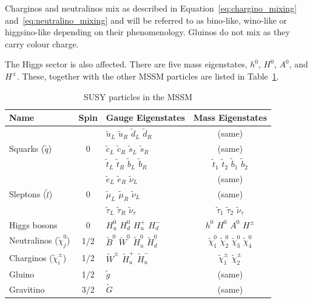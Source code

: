 				Charginos and neutralinos mix as described in Equation~\ref{eq:chargino_mixing} and~\ref{eq:neutralino_mixing} and will be referred to as bino-like, wino-like or higgsino-like depending on their phenomenology. Gluinos do not mix as they carry colour charge. 

				The Higgs sector is also affected. There are five mass eigenstates, $h^0$, $H^0$, $A^0$, and $H^{\pm}$. These, together with the other \ac{MSSM} particles are listed in Table~\ref{tab:MSSM_particles}. 
				
				\begin{table}[!htb]\centering\caption{\ac{SUSY} particles in the \ac{MSSM}}
				\renewcommand{\arraystretch}{1.4}
					\begin{tabular}{lclc}
						\toprule
						\textbf{Name} & \textbf{Spin} & \textbf{Gauge Eigenstates} & \textbf{Mass Eigenstates} \\
						\toprule
						
						\multirow{3}{*}{Squarks ($\tilde{q}$)} & \multirow{3}{*}{0} 
						& $\tilde{u}_L$ $\tilde{u}_R$ $\tilde{d}_L$ $\tilde{d}_R$ & (same) \\
						& & $\tilde{c}_L$ $\tilde{c}_R$ $\tilde{s}_L$ $\tilde{s}_R$ & (same) \\
						& & $\tilde{t}_L$ $\tilde{t}_R$ $\tilde{b}_L$ $\tilde{b}_R$ & $\tilde{t}_1$ $\tilde{t}_2$ $\tilde{b}_1$ $\tilde{b}_2$ \\ 
						\midrule

						\multirow{3}{*}{Sleptons ($\tilde{l}$)} & \multirow{3}{*}{0} 
						& $\tilde{e}_L$ $\tilde{e}_R$ $\tilde{\nu}_L$ & (same) \\
						& & $\tilde{\mu}_L$ $\tilde{\mu}_R$ $\tilde{\nu}_L$ & (same) \\ 
						& & $\tilde{\tau}_L$ $\tilde{\tau}_R$ $\tilde{\nu}_{\tau}$ & $\tilde{\tau}_1$ $\tilde{\tau}_2$ $\tilde{\nu}_{\tau}$ \\ 
						\midrule
						
						Higgs bosons & 0 & $H_u^0$ $H_d^0$ $H_u^+$ $H_d^-$ & $h^0$ $H^0$ $A^0$ $H^{\pm}$ \\ 
						\midrule 

						Neutralinos ($\tilde{\chi}_j^0$)   & 1/2 & $\tilde{B}^0$ $\tilde{W}^0$ $\tilde{H}_u^0$ $\tilde{H}_d^0$ & $\tilde{\chi}_1^0$ $\tilde{\chi}_2^0$ $\tilde{\chi}_3^0$ $\tilde{\chi}_4^0$\\
						Charginos ($\tilde{\chi}_i^{\pm}$) & 1/2 & $\tilde{W}^{\pm}$ $\tilde{H}_u^+$ $\tilde{H}_u^-$ & $\tilde{\chi}_1^{\pm}$ $\tilde{\chi}_2^{\pm}$ \\
						\midrule

						Gluino & 1/2 & $\tilde{g}$ & (same) \\
						Gravitino & 3/2 & $\tilde{G}$ & (same) \\ 					
						\bottomrule
					\end{tabular}						
				\label{tab:MSSM_particles} 
				\end{table}


